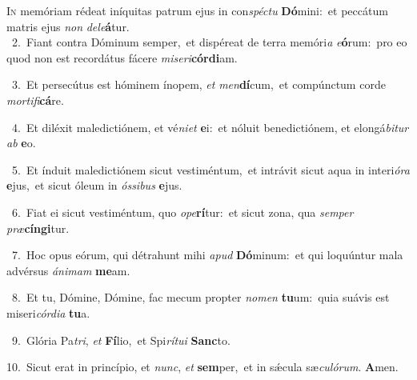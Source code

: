 \lettrine{\initial\textcolor{\initialcolor}{I}}{n} memóriam rédeat iníquitas patrum ejus in con\-\textit{spéc}\-\textit{tu} \textbf{Dó}\-mini:~\star et peccátum matris ejus \textit{non} \textit{de}\-\textit{le}\textbf{á}tur.\\
{\numbfont\textcolor{\numbcolor}{~2.}}~Fiant contra Dóminum semper,~\dagger et dispéreat de terra memóri\textit{a} \textit{e}\-\textbf{ó}rum:~\star pro eo quod non est recordátus fácere \textit{mi}\-\textit{se}\textit{ri}\textbf{cór}\textbf{di}am.\par
{\numbfont\textcolor{\numbcolor}{~3.}}~Et persecútus est hóminem ínopem, \textit{et} \textit{men}\-\textbf{dí}cum,~\star et compúnctum corde \textit{mor}\-\textit{ti}\textit{fi}\textbf{cá}re.\par
{\numbfont\textcolor{\numbcolor}{~4.}}~Et diléxit maledictiónem, et vé\-\textit{ni}\-\textit{et} \textbf{e}\-i:~\star et nóluit benedictiónem, et elongá\-\textit{bi}\-\textit{tur} \textit{ab} \textbf{e}\-o.\par
{\numbfont\textcolor{\numbcolor}{~5.}}~Et índuit maledictiónem sicut vestiméntum,~\dagger et intrávit sicut aqua in interi\-\textit{ó}\-\textit{ra} \textbf{e}\-jus,~\star et sicut óleum in \textit{ós}\-\textit{si}\textit{bus} \textbf{e}\-jus.\par
{\numbfont\textcolor{\numbcolor}{~6.}}~Fiat ei sicut vestiméntum, quo \textit{o}\-\textit{pe}\textbf{rí}tur:~\star et sicut zona, qua \textit{sem}\-\textit{per} \textit{præ}\-\textbf{cín}\textbf{gi}tur.\par
{\numbfont\textcolor{\numbcolor}{~7.}}~Hoc opus eórum, qui détrahunt mihi \textit{a}\-\textit{pud} \textbf{Dó}\-minum:~\star et qui loquúntur mala advérsus \textit{á}\-\textit{ni}\textit{mam} \textbf{me}\-am.\par
{\numbfont\textcolor{\numbcolor}{~8.}}~Et tu, Dómine, Dómine, fac mecum propter \textit{no}\-\textit{men} \textbf{tu}\-um:~\star quia suávis est miseri\-\textit{cór}\-\textit{di}\textit{a} \textbf{tu}\-a.\par
{\numbfont\textcolor{\numbcolor}{~9.}}~Glória Pa\-\textit{tri}\-, \textit{et} \textbf{Fí}\-lio,~\star et Spi\-\textit{rí}\-\textit{tu}\textit{i} \textbf{Sanc}\-to.\par
{\numbfont\textcolor{\numbcolor}{10.}}~Sicut erat in princípio, et \textit{nunc}\-, \textit{et} \textbf{sem}\-per,~\star et in sǽcula sæ\-\textit{cu}\-\textit{ló}\textit{rum}. \textbf{A}\-men.\par
